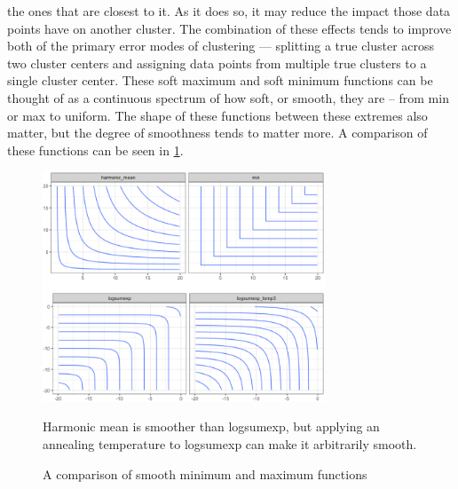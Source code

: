 {the ones that are closest to it. As it does so, it may reduce the impact those data points have on another cluster. The combination of these effects tends to improve both of the primary error modes of clustering --- splitting a true cluster across two cluster centers and assigning data points from multiple true clusters to a single cluster center. These soft maximum and soft minimum functions can be thought of as a continuous spectrum of how soft, or smooth, they are -- from min or max to uniform. The shape of these functions between these extremes also matter, but the degree of smoothness tends to matter more. A comparison of these functions can be seen in \ref{figure:softmax}. 
}


\begin{figure}[th!]
\caption{A comparison of smooth minimum and maximum functions}
\label{figure:softmax}
\begin{centering}

\includegraphics[width=0.75\textwidth]{softmax.png} 
\par{Harmonic mean is smoother than logsumexp, but applying an annealing temperature to logsumexp can make it arbitrarily smooth.}

\end{centering}
\end{figure}


